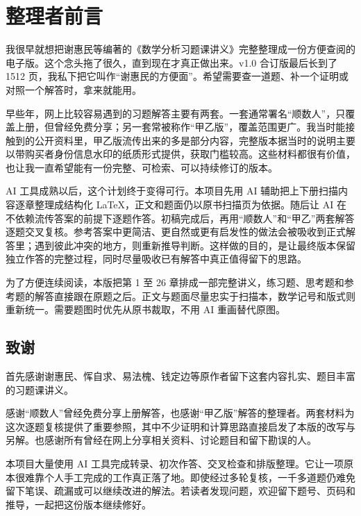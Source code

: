 \chapter*{整理者前言}

我很早就想把谢惠民等编著的《数学分析习题课讲义》完整整理成一份方便查阅的电子版。这个念头拖了很久，直到现在才真正做出来。v1.0 合订版最后长到了 1512 页，我私下把它叫作“谢惠民的方便面”。希望需要查一道题、补一个证明或对照一个解答时，拿来就能用。

早些年，网上比较容易遇到的习题解答主要有两套。一套通常署名“顺数人”，只覆盖上册，但曾经免费分享；另一套常被称作“甲乙版”，覆盖范围更广。我当时能接触到的公开资料里，甲乙版流传出来的多是部分内容，完整版本据当时的说明主要以带购买者身份信息水印的纸质形式提供，获取门槛较高。这些材料都很有价值，也让我一直希望能有一份完整、可检索、可以持续修订的版本。

AI 工具成熟以后，这个计划终于变得可行。本项目先用 AI 辅助把上下册扫描内容逐章整理成结构化 LaTeX，正文和题面仍以原书扫描页为依据。随后让 AI 在不依赖流传答案的前提下逐题作答。初稿完成后，再用“顺数人”和“甲乙”两套解答逐题交叉复核。参考答案中更简洁、更自然或更有启发性的做法会被吸收到正式解答里；遇到彼此冲突的地方，则重新推导判断。这样做的目的，是让最终版本保留独立作答的完整过程，同时尽量吸收已有解答中真正值得留下的思路。

为了方便连续阅读，本版把第 1 至 26 章排成一部完整讲义，练习题、思考题和参考题的解答直接跟在原题之后。正文与题面尽量忠实于扫描本，数学记号和版式则重新统一。需要题图时优先从原书裁取，不用 AI 重画替代原图。

\section*{致谢}

首先感谢谢惠民、恽自求、易法槐、钱定边等原作者留下这套内容扎实、题目丰富的习题课讲义。

感谢“顺数人”曾经免费分享上册解答，也感谢“甲乙版”解答的整理者。两套材料为这次逐题复核提供了重要参照，其中不少证明和计算思路直接启发了本版的改写与另解。也感谢所有曾经在网上分享相关资料、讨论题目和留下勘误的人。

本项目大量使用 AI 工具完成转录、初次作答、交叉检查和排版整理。它让一项原本很难靠个人手工完成的工作真正落了地。即使经过多轮复核，一千多道题仍难免留下笔误、疏漏或可以继续改进的解法。若读者发现问题，欢迎留下题号、页码和推导，一起把这份版本继续修好。
